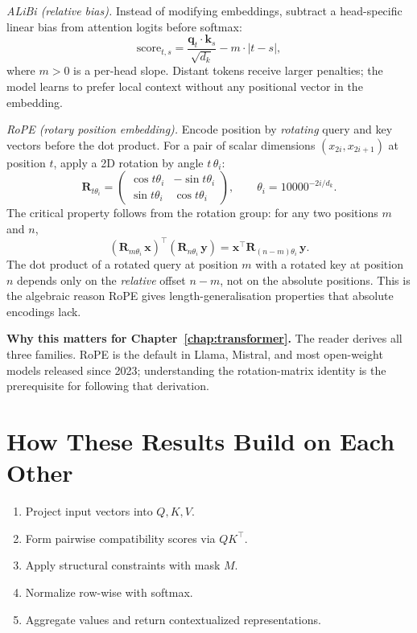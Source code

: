 \begin{itemize}[leftmargin=1.5em]
  \emph{ALiBi (relative bias).} Instead of modifying embeddings, subtract a head-specific linear bias from attention logits before softmax:
  \[
    \mathrm{score}_{t,s} = \frac{\mathbf{q}_t \cdot \mathbf{k}_s}{\sqrt{d_k}} - m \cdot |t - s|,
  \]
  where $m > 0$ is a per-head slope. Distant tokens receive larger penalties; the model learns to prefer local context without any positional vector in the embedding.

  \emph{RoPE (rotary position embedding).} Encode position by \emph{rotating} query and key vectors before the dot product. For a pair of scalar dimensions $(x_{2i}, x_{2i+1})$ at position $t$, apply a 2D rotation by angle $t\,\theta_i$:
  \[
    \mathbf{R}_{t\theta_i}
    = \begin{pmatrix} \cos t\theta_i & -\sin t\theta_i \\
                      \sin t\theta_i &  \cos t\theta_i \end{pmatrix},
    \qquad \theta_i = 10000^{-2i/d_k}.
  \]
  The critical property follows from the rotation group: for any two positions $m$ and $n$,
  \[
    (\mathbf{R}_{m\theta_i}\,\mathbf{x})^\top
    (\mathbf{R}_{n\theta_i}\,\mathbf{y})
    = \mathbf{x}^\top \mathbf{R}_{(n-m)\theta_i}\,\mathbf{y}.
  \]
  The dot product of a rotated query at position $m$ with a rotated key at position $n$ depends only on the \emph{relative} offset $n - m$, not on the absolute positions. This is the algebraic reason RoPE gives length-generalisation properties that absolute encodings lack.

  \textbf{Why this matters for Chapter~\ref{chap:transformer}.} The reader derives all three families. RoPE is the default in Llama, Mistral, and most open-weight models released since 2023; understanding the rotation-matrix identity is the prerequisite for following that derivation.
\end{itemize}

\section*{How These Results Build on Each Other}
\begin{enumerate}[leftmargin=1.5em]
  \item Project input vectors into $Q,K,V$.
  \item Form pairwise compatibility scores via $QK^\top$.
  \item Apply structural constraints with mask $M$.
  \item Normalize row-wise with softmax.
  \item Aggregate values and return contextualized representations.
\end{enumerate}

